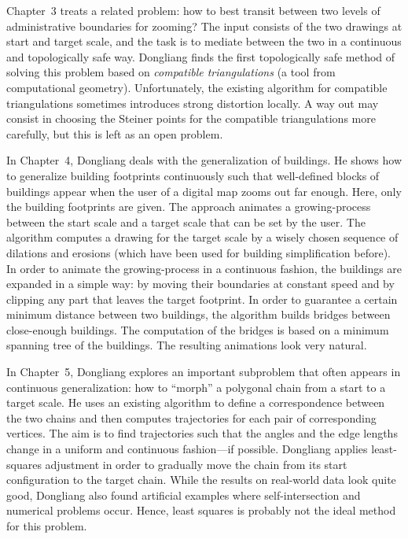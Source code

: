 {Chapter~3 treats a related problem: how to best transit between
two levels of administrative boundaries for zooming?  The
input consists of the two drawings at start and target scale, and
the task is to mediate between the two in a continuous and
topologically safe way. 
Dongliang finds the first
topologically safe method of solving this problem based on
\emph{compatible triangulations} (a tool from computational
geometry).  Unfortunately, the existing algorithm for compatible
triangulations sometimes introduces strong distortion locally.  A
way out may consist in choosing the Steiner points for the
compatible triangulations more carefully, but this is left as an
open problem.

In Chapter~4, Dongliang deals with the generalization of buildings.
He shows how to generalize building footprints continuously such
that well-defined blocks of buildings appear when the user of a
digital map zooms out far enough.  Here, only the building
footprints are given.  The approach animates a growing-process
between the start scale and a target scale that can be set by the
user.  The algorithm computes a drawing for the target scale by a
wisely chosen sequence of dilations and erosions
(which have been used for building simplification before).  
In order to animate the
growing-process in a continuous fashion, the buildings are expanded
in a simple way: by moving their boundaries at constant speed and by
clipping any part that leaves the target footprint.  In order to
guarantee a certain minimum distance between two buildings, the
algorithm builds bridges between close-enough buildings.  
The computation of the bridges is based on 
a minimum spanning tree of the buildings.  
The resulting animations look very natural.

In Chapter~5, Dongliang explores an important subproblem that often
appears in continuous generalization: how to ``morph'' a polygonal
chain from a start to a target scale.  He uses an existing algorithm
to define a correspondence between the two chains and then computes
trajectories for each pair of corresponding vertices.  
The aim is to find trajectories such that 
the angles and the edge lengths change 
in a uniform and continuous fashion---if possible.  
Dongliang applies least-squares adjustment in order to
gradually move the chain from its start configuration to the target
chain.  While the results on real-world data look quite good,
Dongliang also found artificial examples where self-intersection and
numerical problems occur.  Hence, least squares is probably not the
ideal method for this problem.

}
